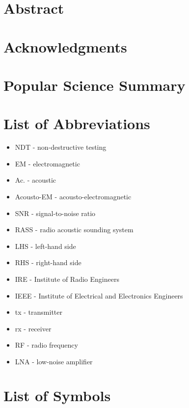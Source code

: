 \documentclass[10pt,a4paper]{eitExjobb}
\begin{document}
	
	
	\MakeTitlePage  %
	
	\frontmatter    %
	
	\chapter*{Abstract}
	
	\chapter*{Acknowledgments}
	
	\chapter*{Popular Science Summary}
	\tableofcontents
	\listoffigures
	\listoftables
	\chapter*{List of Abbreviations}
	\begin{itemize}
		\item NDT - non-destructive testing
		\item EM - electromagnetic
		\item Ac. - acoustic
		\item Acousto-EM - acousto-electromagnetic
		\item SNR - signal-to-noise ratio
		\item RASS - radio acoustic sounding system
		\item LHS - left-hand side
		\item RHS - right-hand side
		\item IRE - Institute of Radio Engineers
		\item IEEE - Institute of Electrical and Electronics Engineers
		\item tx - transmitter
		\item rx - receiver
		\item RF - radio frequency
		\item LNA - low-noise amplifier
	\end{itemize}
	
	\chapter*{List of Symbols}
	\cleardoublepage
	
\end{document}
